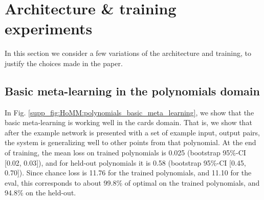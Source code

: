 
\section{Architecture \& training experiments} \label{app_lesion_results}
In this section we consider a few variations of the architecture and training, to justify the choices made in the paper. \par

\subsection{Basic meta-learning in the polynomials domain}

In Fig. \ref{supp_fig:HoMM:polynomials_basic_meta_learning}, we show that the basic meta-learning is working well in the cards domain. That is, we show that after the example network is presented with a set of example input, output pairs, the system is generalizing well to other points from that polynomial. At the end of training, the mean loss on trained polynomials is 0.025 (bootstrap 95\%-CI [0.02, 0.03]), and for held-out polynomials it is 0.58 (bootstrap 95\%-CI [0.45, 0.70]). Since chance loss is 11.76 for the trained polynomials, and 11.10 for the eval, this corresponds to about 99.8\% of optimal on the trained polynomials, and 94.8\% on the held-out.

